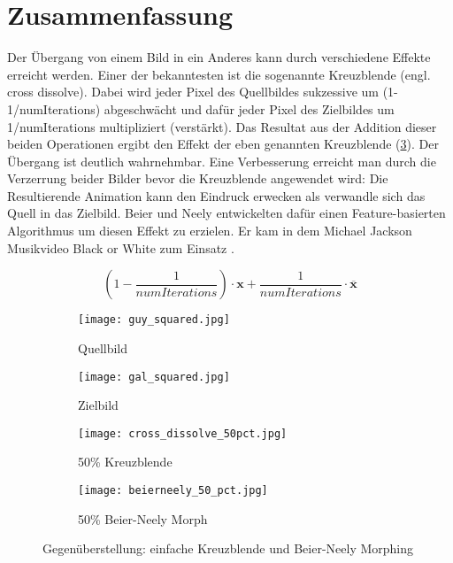 \section*{Zusammenfassung}

Der Übergang von einem Bild in ein Anderes kann durch verschiedene
Effekte erreicht werden. Einer der bekanntesten ist die sogenannte
Kreuzblende (engl. cross dissolve). Dabei wird jeder Pixel des Quellbildes
sukzessive um (1-1/numIterations) abgeschwächt und dafür jeder Pixel
des Zielbildes um 1/numIterations multipliziert (verstärkt). 
Das Resultat aus der Addition dieser beiden Operationen ergibt den
Effekt der eben genannten Kreuzblende (\ref{fig:dissolve}). Der Übergang
ist deutlich wahrnehmbar. Eine Verbesserung erreicht man durch die Verzerrung
beider Bilder bevor die Kreuzblende angewendet wird: Die Resultierende Animation
kann den Eindruck erwecken als verwandle sich das Quell in das Zielbild.
Beier und Neely \cite{beierneely} entwickelten dafür einen Feature-basierten 
Algorithmus um diesen Effekt zu erzielen. Er kam in dem Michael Jackson Musikvideo
Black or White zum Einsatz \cite{cartoonbrew}.

\begin{equation}	
	\left( 1-\frac{1}{numIterations} \right) \cdot \mathbf{x} + \frac{1}{numIterations} \cdot \overline{\mathbf{x}}
\end{equation}




\begin{figure}
	
	\centering
	\begin{subfigure}{0.4\textwidth}
		\centering
		\texttt{[image: guy\_squared.jpg]}
		\caption{Quellbild}
		\label{fig:source}
	\end{subfigure}
	\hfill
	\begin{subfigure}{0.4\textwidth}
		\centering
		\texttt{[image: gal\_squared.jpg]}
		\caption{Zielbild}
		\label{fig:dest}
	\end{subfigure}
	
	\centering
	\begin{subfigure}{0.4\textwidth}
		\centering
		\texttt{[image: cross\_dissolve\_50pct.jpg]}
		\caption{50\% Kreuzblende}
		\label{fig:dissolve}
	\end{subfigure}
	\hfill
	\begin{subfigure}{0.4\textwidth}
		\centering
		\texttt{[image: beierneely\_50\_pct.jpg]}
		\caption{50\% Beier-Neely Morph}
		\label{fig:morph}
	\end{subfigure}
	\caption{Gegenüberstellung: einfache Kreuzblende und Beier-Neely Morphing}
	\label{fig:side-by-side}
	
\end{figure}
